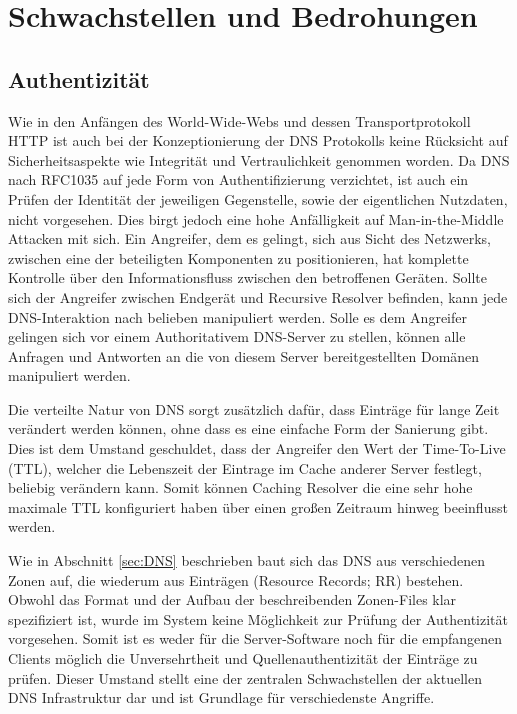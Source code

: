 \chapter{Schwachstellen und Bedrohungen}
\label{cap:threads}


\section{Authentizität}
\label{sec:Thread-Auth}

Wie in den Anfängen des World-Wide-Webs und dessen Transportprotokoll HTTP ist auch bei der Konzeptionierung der DNS Protokolls keine Rücksicht auf Sicherheitsaspekte wie Integrität und Vertraulichkeit genommen worden. Da DNS nach RFC1035 auf jede Form von Authentifizierung verzichtet, ist auch ein Prüfen der Identität der jeweiligen Gegenstelle, sowie der eigentlichen Nutzdaten, nicht vorgesehen. Dies birgt jedoch eine hohe Anfälligkeit auf Man-in-the-Middle Attacken mit sich. Ein Angreifer, dem es gelingt, sich aus Sicht des Netzwerks, zwischen eine der beteiligten Komponenten zu positionieren, hat komplette Kontrolle über den Informationsfluss zwischen den betroffenen Geräten. Sollte sich der Angreifer zwischen Endgerät und Recursive Resolver befinden, kann jede DNS-Interaktion nach belieben manipuliert werden. Solle es dem Angreifer gelingen sich vor einem Authoritativem DNS-Server zu stellen, können alle Anfragen und Antworten an die von diesem Server bereitgestellten Domänen manipuliert werden. 

Die verteilte Natur von DNS sorgt zusätzlich dafür, dass Einträge für lange Zeit verändert werden können, ohne dass es eine einfache Form der Sanierung gibt. Dies ist dem Umstand geschuldet, dass der Angreifer den Wert der Time-To-Live (TTL), welcher die Lebenszeit der Eintrage im Cache anderer Server festlegt, beliebig verändern kann. Somit können Caching Resolver die eine sehr hohe maximale TTL konfiguriert haben über einen großen Zeitraum hinweg beeinflusst werden.

Wie in Abschnitt \ref{sec:DNS} beschrieben baut sich das DNS aus verschiedenen Zonen auf, die wiederum aus Einträgen (Resource Records; RR) bestehen. Obwohl das Format und der Aufbau der beschreibenden Zonen-Files klar spezifiziert ist, wurde im System keine Möglichkeit zur Prüfung der Authentizität vorgesehen. Somit ist es weder für die Server-Software noch für die empfangenen Clients möglich die Unversehrtheit und Quellenauthentizität der Einträge zu prüfen. Dieser Umstand stellt eine der zentralen Schwachstellen der aktuellen DNS Infrastruktur dar und ist Grundlage für verschiedenste Angriffe.

